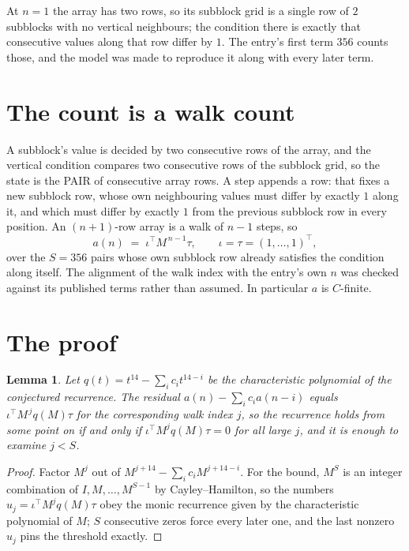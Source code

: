 \documentclass[11pt,a4paper]{article}
\theoremstyle{plain}
\newtheorem{lemma}[theorem]{Lemma}
\theoremstyle{definition}
\begin{document}
At $n=1$ the array has two rows, so its subblock grid is a single row of $2$ subblocks with
no vertical neighbours; the condition there is exactly that consecutive values along that row
differ by $1$. The entry's first term $356$ counts those, and the model was made to
reproduce it along with every later term.

\section{The count is a walk count}

A subblock's value is decided by two consecutive rows of the array, and the
vertical condition compares two consecutive rows of the subblock grid, so the state is the
PAIR of consecutive array rows. A step appends a row: that fixes a new subblock row, whose own
neighbouring values must differ by exactly $1$ along it, and which must differ by exactly
$1$ from the previous subblock row in every position. An $(n+1)$-row array is a walk of
$n-1$ steps, so
\[
a(n)\;=\;\iota^{\!\top}M^{\,n-1}\tau,\qquad\iota=\tau=(1,\dots,1)^{\!\top},
\]
over the $S=356$ pairs whose own subblock row already satisfies the condition along itself.
The alignment of the walk index with the entry's own $n$ was checked against its published
terms rather than assumed. In particular $a$ is $C$-finite.

\section{The proof}

\begin{lemma}\label{lem:crit}
Let $q(t)=t^{14}-\sum_i c_it^{14-i}$ be the characteristic polynomial of the
conjectured recurrence. The residual $a(n)-\sum_ic_ia(n-i)$ equals
$\iota^{\!\top}M^{\,j}q(M)\tau$ for the corresponding walk index $j$, so the recurrence
holds from some point on if and only if $\iota^{\!\top}M^{j}q(M)\tau=0$ for all large $j$,
and it is enough to examine $j<S$.
\end{lemma}

\begin{proof}
Factor $M^{j}$ out of $M^{j+14}-\sum_ic_iM^{j+14-i}$. For the bound, $M^{S}$
is an integer combination of $I,M,\dots,M^{S-1}$ by Cayley--Hamilton, so the numbers
$u_j=\iota^{\!\top}M^{j}q(M)\tau$ obey the monic recurrence given by the characteristic
polynomial of $M$; $S$ consecutive zeros force every later one, and the last nonzero $u_j$
pins the threshold exactly.
\end{proof}
\end{document}
